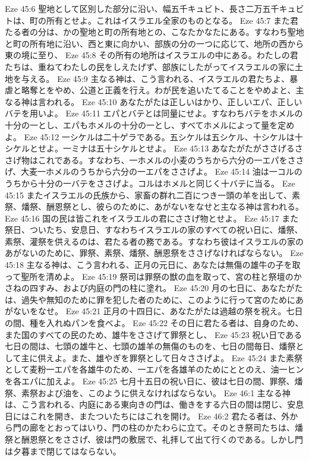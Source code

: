 Eze 45:6  聖地として区別した部分に沿い、幅五千キュビト、長さ二万五千キュビトは、町の所有とせよ。これはイスラエル全家のものとなる。
Eze 45:7  また君たる者の分は、かの聖地と町の所有地との、こなたかなたにある。すなわち聖地と町の所有地に沿い、西と東に向かい、部族の分の一つに応じて、地所の西から東の境に至り、
Eze 45:8  その所有の地所はイスラエルの中にある。わたしの君たちは、重ねてわたしの民をしえたげず、部族にしたがってイスラエルの家に土地を与える。
Eze 45:9  主なる神は、こう言われる、イスラエルの君たちよ、暴虐と略奪とをやめ、公道と正義を行え。わが民を追いたてることをやめよと、主なる神は言われる。
Eze 45:10  あなたがたは正しいはかり、正しいエパ、正しいバテを用いよ。
Eze 45:11  エパとバテとは同量にせよ。すなわちバテをホメルの十分の一とし、エパもホメルの十分の一とし、すべてホメルによって量を定めよ。
Eze 45:12  一シケルは二十ゲラである。五シケルは五シケル、十シケルは十シケルとせよ。一ミナは五十シケルとせよ。
Eze 45:13  あなたがたがささげるささげ物はこれである。すなわち、一ホメルの小麦のうちから六分の一エパをささげ、大麦一ホメルのうちから六分の一エパをささげよ。
Eze 45:14  油は一コルのうちから十分の一バテをささげよ。コルはホメルと同じく十バテに当る。
Eze 45:15  またイスラエルの氏族から、家畜の群れ二百につき一頭の羊を出して、素祭、燔祭、酬恩祭とし、彼らのために、あがないをなせと主なる神は言われる。
Eze 45:16  国の民は皆これをイスラエルの君にささげ物とせよ。
Eze 45:17  また祭日、ついたち、安息日、すなわちイスラエルの家のすべての祝い日に、燔祭、素祭、灌祭を供えるのは、君たる者の務である。すなわち彼はイスラエルの家のあがないのために、罪祭、素祭、燔祭、酬恩祭をささげなければならない。
Eze 45:18  主なる神は、こう言われる、正月の元日に、あなたは無傷の雄牛の子を取って聖所を清めよ。
Eze 45:19  祭司は罪祭の獣の血を取って、宮の柱と祭壇のかさねの四すみ、および内庭の門の柱に塗れ。
Eze 45:20  月の七日に、あなたがたは、過失や無知のために罪を犯した者のために、このように行って宮のためにあがないをなせ。
Eze 45:21  正月の十四日に、あなたがたは過越の祭を祝え。七日の間、種を入れぬパンを食べよ。
Eze 45:22  その日に君たる者は、自身のため、また国のすべての民のため、雄牛をささげて罪祭とし、
Eze 45:23  祝い日である七日の間は、七頭の雄牛と、七頭の雄羊の無傷のものを、七日の間毎日、燔祭として主に供えよ。また、雄やぎを罪祭として日々ささげよ。
Eze 45:24  また素祭として麦粉一エパを各雄牛のため、一エパを各雄羊のためにととのえ、油一ヒンを各エパに加えよ。
Eze 45:25  七月十五日の祝い日に、彼は七日の間、罪祭、燔祭、素祭および油を、このように供えなければならない。
Eze 46:1  主なる神は、こう言われる、内庭にある東向きの門は、働きをする六日の間は閉じ、安息日にはこれを開き、またついたちにはこれを開け。
Eze 46:2  君たる者は、外から門の廊をとおってはいり、門の柱のかたわらに立て。そのとき祭司たちは、燔祭と酬恩祭とをささげ、彼は門の敷居で、礼拝して出て行くのである。しかし門は夕暮まで閉じてはならない。
